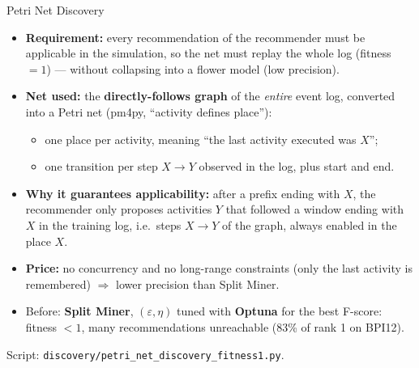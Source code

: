 \documentclass[aspectratio=169]{beamer} %
\begin{document}
\begin{frame}{Petri Net Discovery}
  \footnotesize
  \begin{itemize}
    \item \textbf{Requirement:} every recommendation of the recommender must be
      \alert{applicable} in the simulation, so the net must replay the whole log
      (\alert{fitness $= 1$}) --- without collapsing into a flower model (low precision).
    \item \textbf{Net used:} the \textbf{directly-follows graph} of the \emph{entire} event log,
      converted into a Petri net (pm4py, ``activity defines place''):
      \begin{itemize}
        \item one place per activity, meaning ``the last activity executed was $X$'';
        \item one transition per step $X \rightarrow Y$ observed in the log, plus start and end.
      \end{itemize}
    \item \textbf{Why it guarantees applicability:} after a prefix ending with $X$, the
      recommender only proposes activities $Y$ that followed a window ending with $X$ in the
      training log, i.e.\ steps $X \rightarrow Y$ of the graph, always enabled in the place $X$.
    \item \textbf{Price:} no concurrency and no long-range constraints (only the last activity
      is remembered) $\Rightarrow$ lower precision than Split Miner.
    \item Before: \textbf{Split Miner}, $(\varepsilon, \eta)$ tuned with \textbf{Optuna} for the best
      F-score: fitness $< 1$, many recommendations \alert{unreachable} (83\% of rank 1 on BPI12).
  \end{itemize}
  {\scriptsize Script: \texttt{discovery/petri\_net\_discovery\_fitness1.py}.}
\end{frame}
\end{document}
